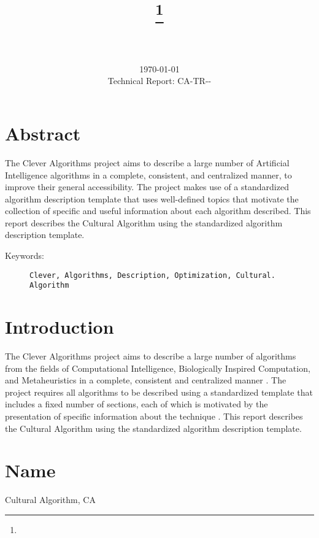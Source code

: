 \documentclass[a4paper, 11pt]{article}
\title{{\myreporttitle}\footnote{\myreportlicense}}
\author{\myreportauthor\\{\myreportemail}\\\small\myreportproject}
\date{\today\\{\small{Technical Report: CA-TR-{\myreportdate}-\myreportversion}}}
\begin{document}
\maketitle

\section*{Abstract} 
The Clever Algorithms project aims to describe a large number of Artificial Intelligence algorithms in a complete, consistent, and centralized manner, to improve their general accessibility. 
The project makes use of a standardized algorithm description template that uses well-defined topics that motivate the collection of specific and useful information about each algorithm described.
This report describes the Cultural Algorithm using the standardized algorithm description template.

\begin{description}
	\item[Keywords:] {\small\texttt{Clever, Algorithms, Description, Optimization, Cultural. Algorithm}}
\end{description} 

\section{Introduction} 
\label{sec:intro}
The Clever Algorithms project aims to describe a large number of algorithms from the fields of Computational Intelligence, Biologically Inspired Computation, and Metaheuristics in a complete, consistent and centralized manner \cite{Brownlee2010}.
The project requires all algorithms to be described using a standardized template that includes a fixed number of sections, each of which is motivated by the presentation of specific information about the technique \cite{Brownlee2010a}.
This report describes the Cultural Algorithm using the standardized algorithm description template.

\section{Name} 
\label{sec:name}
Cultural Algorithm, CA
\end{document}
